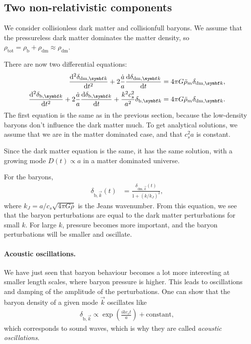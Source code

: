 \subsection{Two non-relativistic components}
We consider collisionless dark matter and collisionfull baryons. We assume that the pressureless dark matter dominates the matter density, so $\rho_\text{tot} = \rho_\text{b} + \rho_\text{dm} \approx \rho_\text{dm}$.

There are now two differential equations:
\begin{align*}
	\dv[2]{\delta_{\text{dm}, \vec{k}}}{t}
	+ 2 \frac{\dot{a}}{a} \dv{\delta_{\text{dm}, \vec{k}}}{t}
	&= 4 \pi G \bar{\rho}_m \delta_{\text{dm}, \vec{k}},\\
	\dv[2]{\delta_{\text{b}, \vec{k}}}{t}
	+ 2 \frac{\dot{a}}{a} \dv{\delta_{\text{b}, \vec{k}}}{t}
	+ \frac{k^2 c_s^2}{a^2} \delta_{\text{b},\vec{k}}
	&= 4 \pi G \bar{\rho}_m \delta_{\text{dm}, \vec{k}}.
\end{align*}
The first equation is the same as in the previous section, because the low-density baryons don't influence the dark matter much. To get analytical solutions, we assume that we are in the matter dominated case, and that $c_s^2 a$ is constant.

Since the dark matter equation is the same, it has the same solution, with a growing mode $D(t) \propto a$ in a matter dominated universe.

For the baryons,
\begin{align*}
	\delta_{\text{b},\vec{k}}(t)
	&= \frac{\delta_{\text{dm},\vec{k}}(t)}{1 + (k/k_J)^2},
\end{align*}
where $k_J = a/c_s \sqrt{4 \pi G \bar{\rho}}$ is the Jeans wavenumber. From this equation, we see that the baryon perturbations are equal to the dark matter perturbations for small $k$. For large $k$, pressure becomes more important, and the baryon perturbations will be smaller and oscillate.

\paragraph*{Acoustic oscillations.}
We have just seen that baryon behaviour becomes a lot more interesting at smaller length scales, where baryon pressure is higher. This leads to oscillations and damping of the amplitude of the perturbations. One can show that the baryon density of a given mode $\vec{k}$ oscillates like
\begin{align*}
	\delta_{\text{b},\vec{k}} \propto \exp(\frac{i k c_s t}{a}) + \text{constant},
\end{align*}
which corresponds to sound waves, which is why they are called \emph{acoustic oscillations}.


